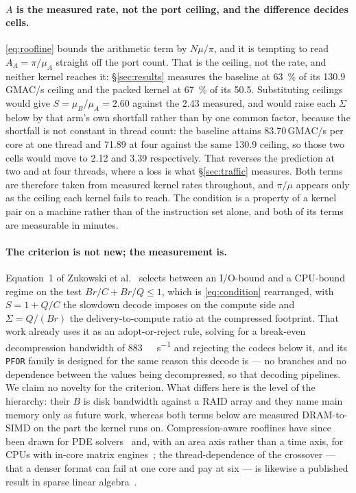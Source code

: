 \documentclass[11pt,a4paper]{article}
\newcommand{\code}[1]{\texttt{#1}}
\begin{document}
\paragraph{$A$ is the measured rate, not the port ceiling, and the difference
decides cells.}
\eqref{eq:roofline} bounds the arithmetic term by $N\mu/\pi$, and it is tempting
to read $A_{A}=\pi/\mu_{A}$ straight off the port count. That is the ceiling, not
the rate, and neither kernel reaches it: \S\ref{sec:results} measures the
baseline at \SI{63}{\percent} of its \num{130.9}\,GMAC/s ceiling and the packed
kernel at \SI{67}{\percent} of its \num{50.5}. Substituting ceilings would give
$S=\mu_{B}/\mu_{A}=\num{2.60}$ against the \num{2.43} measured, and would raise
each $\Sigma$ below by that arm's own shortfall rather than by one common
factor, because the shortfall is not constant in thread count: the baseline
attains \num{83.70}\,GMAC/s per core at one thread and \num{71.89} at four
against the same \num{130.9} ceiling, so those two cells would move to
\num{2.12} and \num{3.39} respectively. That reverses the prediction at two and at four
threads, where a loss is what \S\ref{sec:traffic} measures. Both terms are
therefore taken from measured kernel rates throughout, and $\pi/\mu$ appears
only as the ceiling each kernel fails to reach. The condition is a property of a
kernel pair on a machine rather than of the instruction set alone, and both of
its terms are measurable in minutes.

\paragraph{The criterion is not new; the measurement is.}
Equation~1 of Zukowski et al.~\cite{zukowski} selects between an I/O-bound and a
CPU-bound regime on the test $Br/C + Br/Q \le 1$, which is
\eqref{eq:condition} rearranged, with $S=1+Q/C$ the slowdown decode imposes on
the compute side and $\Sigma=Q/(Br)$ the delivery-to-compute ratio at the
compressed footprint. That work already uses it as an adopt-or-reject rule,
solving for a break-even decompression bandwidth of \SI{883}{\mega\byte\per
\second} and rejecting the codecs below it, and its \code{PFOR} family is
designed for the same reason this decode is --- no branches and no dependence
between the values being decompressed, so that decoding pipelines. We claim no
novelty for the criterion. What differs here is the level of the hierarchy:
their $B$ is disk bandwidth against a RAID array and they name main memory only
as future work, whereas both terms below are measured DRAM-to-SIMD on the part
the kernel runs on. Compression-aware rooflines have since been drawn for
PDE solvers~\cite{goetschel} and, with an area axis rather than a time axis, for
CPUs with in-core matrix engines~\cite{deca}; the thread-dependence of the
crossover --- that a denser format can fail at one core and pay at six --- is
likewise a published result in sparse linear algebra~\cite{aliaga}.
\end{document}
